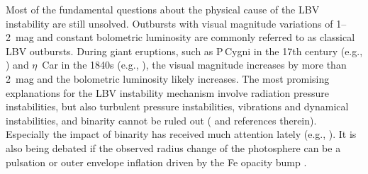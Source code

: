 \documentclass[structabstract]{aa}
\begin{document}
Most of the fundamental questions about the physical cause of the LBV instability are still unsolved. 
Outbursts with visual magnitude variations of 1--2~mag and constant bolometric luminosity are commonly referred to as classical LBV outbursts. During giant eruptions, such as P\,Cygni in the 17th century (e.g., \citealt{1988IrAJ...18..163D,1992A&A...257..153L}) and $\eta$~Car in the 1840s (e.g., \citealt{1997ARA&A..35....1D,2012ASSL..384.....D}), the visual magnitude increases by more than 2~mag and the bolometric luminosity likely increases. 
The most promising explanations for the LBV instability mechanism involve radiation pressure instabilities, but also turbulent pressure instabilities, vibrations and dynamical instabilities, and binarity cannot be ruled out (\citealt{1994PASP..106.1025H} and references therein). Especially the impact of binarity has received much attention lately (e.g., \citealt{2014ApJ...796..121J,2015MNRAS.447..598S,2016A&A...593A..90B}).
It is also being debated if the observed radius change of the photosphere can be a pulsation or outer envelope inflation driven by the Fe opacity bump \citep{2012A&A...538A..40G,2015A&A...580A..20S}.  
\end{document}
